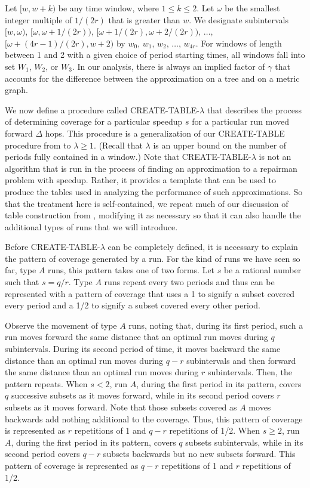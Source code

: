 \documentclass[11pt]{article}
\begin{document}
Let $[w, w+k)$ be any time window, where $1 \leq k \leq 2$.  Let $\omega$ be the smallest integer multiple of $1/(2r)$ that is greater than $w$.  We designate subintervals $[w,\omega)$, $[\omega, \omega + 1/(2r))$, $[\omega + 1/(2r), \omega + 2/(2r))$, $\ldots$, $[\omega + (4r - 1)/(2r), w + 2)$ by $w_0$, $w_1$, $w_2$, $\ldots$, $w_{4r}$.  For windows of length between 1 and 2 with a given choice of period starting times, all windows fall into set $W_1$, $W_2$, or $W_3$.  In our analysis, there is always an implied factor of $\gamma$ that accounts for the difference between the approximation on a tree and on a metric graph.

We now define a procedure called CREATE-TABLE-$\lambda$ that describes the process of determining coverage for a particular speedup $s$ for a particular run moved forward $\Delta$ hops.  This procedure is a generalization of our CREATE-TABLE procedure from \cite{Frederickson5} to $\lambda \geq 1$.  (Recall that $\lambda$ is an upper bound on the number of periods fully contained in a window.) Note that CREATE-TABLE-$\lambda$ is not an algorithm that is run in the process of finding an approximation to a repairman problem with speedup.  Rather, it provides a template that can be used to produce the tables used in analyzing the performance of such approximations.  So that the treatment here is self-contained, we repeat much of our discussion of table construction from \cite{Frederickson5}, modifying it as necessary so that it can also handle the additional types of runs that we will introduce.

Before CREATE-TABLE-$\lambda$ can be completely defined, it is necessary to explain the pattern of coverage generated by a run.  For the kind of runs we have seen so far, type $A$ runs, this pattern takes one of two forms.  Let $s$ be a rational number such that $s = q/r$.  Type $A$ runs repeat every two periods and thus can be represented with a pattern of coverage that uses a 1 to signify a subset covered every period and a 1/2 to signify a subset covered every other period.

Observe the movement of type $A$ runs, noting that, during its first period, such a run moves forward the same distance that an optimal run moves during $q$ subintervals.  During its second period of time, it moves backward the same distance than an optimal run moves during $q - r$ subintervals and then forward the same distance than an optimal run moves during $r$ subintervals. Then, the pattern repeats.  When $s < 2$, run $A$, during the first period in its pattern, covers $q$ successive subsets as it moves forward, while in its second period covers $r$ subsets as it moves forward.  Note that those subsets covered as $A$ moves backwards add nothing additional to the coverage.  Thus, this pattern of coverage is represented as $r$ repetitions of 1 and $q - r$ repetitions of 1/2.  When $s \geq 2$, run $A$, during the first period in its pattern, covers $q$ subsets subintervals, while in its second period covers $q - r$ subsets backwards but no new subsets forward.  This pattern of coverage is represented as $q - r$ repetitions of 1 and $r$ repetitions of 1/2. 
\end{document}
